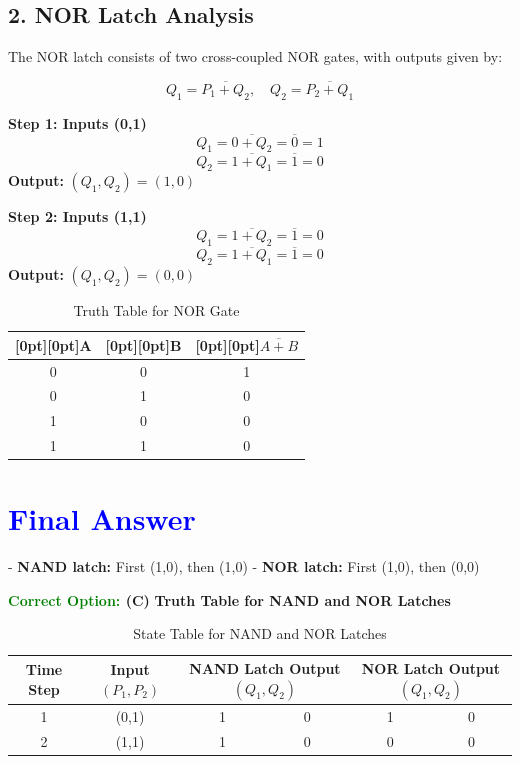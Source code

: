 \documentclass[a4paper,12pt]{article}
\begin{document}
\subsection*{2. NOR Latch Analysis}
The NOR latch consists of two cross-coupled NOR gates, with outputs given by:

\[
Q_1 = \overline{P_1 + Q_2}, \quad Q_2 = \overline{P_2 + Q_1}
\]

\textbf{Step 1: Inputs (0,1)}
\[
Q_1 = \overline{0 + Q_2} = \overline{0} = 1
\]
\[
Q_2 = \overline{1 + Q_1} = \overline{1} = 0
\]
\textbf{Output:} \( (Q_1, Q_2) = (1,0) \)

\textbf{Step 2: Inputs (1,1)}
\[
Q_1 = \overline{1 + Q_2} = \overline{1} = 0
\]
\[
Q_2 = \overline{1 + Q_1} = \overline{1} = 0
\]
\textbf{Output:} \( (Q_1, Q_2) = (0,0) \)

\begin{table}[h]
\centering
\begin{tabular}{|c|c|c|}
\hline
\raisebox{-0.5ex}[0pt][0pt]{A} & \raisebox{-0.5ex}[0pt][0pt]{B} & \raisebox{-0.5ex}[0pt][0pt]{$\overline{A + B}$} \\  %
\hline
0 & 0 & 1 \\
0 & 1 & 0 \\
1 & 0 & 0 \\
1 & 1 & 0 \\
\hline
\end{tabular}
\caption{Truth Table for NOR Gate}
\end{table}

\vspace{-1cm}
\section*{\textcolor{blue}{Final Answer}}
- \textbf{NAND latch:} First (1,0), then (1,0)
- \textbf{NOR latch:} First (1,0), then (0,0)

\textbf{\textcolor{green}{Correct Option:} (C)}
\vspace{1cm}
\textbf{Truth Table for NAND and NOR Latches}

\begin{table}[h]
    \centering
    \renewcommand{\arraystretch}{1.5}
    \begin{tabular}{|c|c|c|c|c|c|}
        \hline
        \textbf{Time Step} & \textbf{Input $(P_1, P_2)$} & \multicolumn{2}{c|}{\textbf{NAND Latch Output $(Q_1, Q_2)$}} & \multicolumn{2}{c|}{\textbf{NOR Latch Output $(Q_1, Q_2)$}} \\
        \hline
        1 & (0,1) & 1 & 0 & 1 & 0 \\
        \hline
        2 & (1,1) & 1 & 0 & 0 & 0 \\
        \hline
    \end{tabular}
    \caption{State Table for NAND and NOR Latches}
    \label{tab:latch_states}
\end{table}
\end{document}
